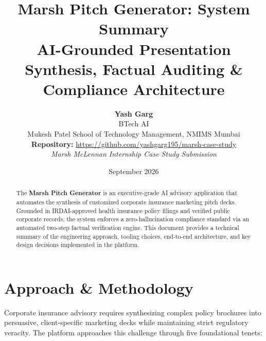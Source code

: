 \documentclass[11pt,a4paper]{article}
\title{\textbf{\LARGE Marsh Pitch Generator: System Summary}\\[0.4em]
\large AI-Grounded Presentation Synthesis, Factual Auditing \& Compliance Architecture}
\author{
    \textbf{\Large Yash Garg} \\[0.2em]
    BTech AI \\
    Mukesh Patel School of Technology Management, NMIMS Mumbai \\[0.4em]
    \textbf{Repository:} \href{https://github.com/yashgarg195/marsh-case-study}{\url{https://github.com/yashgarg195/marsh-case-study}} \\[0.3em]
    \textit{Marsh McLennan Internship Case Study Submission}
}
\date{September 2026}
\begin{document}
\maketitle

\begin{abstract}
The \textbf{Marsh Pitch Generator} is an executive-grade AI advisory application that automates the synthesis of customized corporate insurance marketing pitch decks. Grounded in IRDAI-approved health insurance policy filings and verified public corporate records, the system enforces a zero-hallucination compliance standard via an automated two-step factual verification engine. This document provides a technical summary of the engineering approach, tooling choices, end-to-end architecture, and key design decisions implemented in the platform.
\end{abstract}

\vspace{0.5em}

\section{Approach \& Methodology}

Corporate insurance advisory requires synthesizing complex policy brochures into persuasive, client-specific marketing decks while maintaining strict regulatory veracity. The platform approaches this challenge through five foundational tenets:
\end{document}
